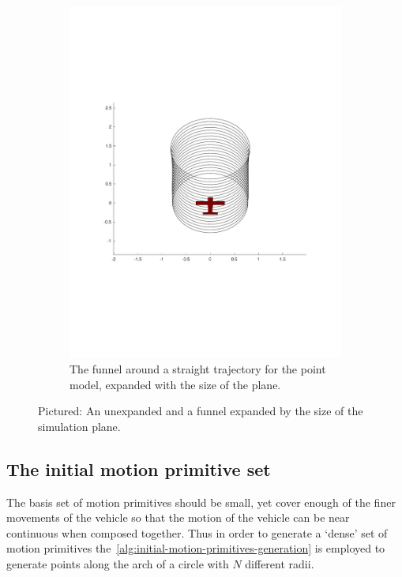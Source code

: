 \begin{figure}
\begin{subfigure}{0.5\textwidth}
    \includegraphics[trim={2cm 5cm 0cm 5cm},
    width=\textwidth]{figures/experiments/expanded-funnel-with-plane}
    \caption{The funnel around a straight trajectory for the point model,
      expanded with the size of the plane.}
  \end{subfigure}
  \caption{Pictured: An unexpanded and a funnel expanded by the size of the
    simulation plane.}
  \label{fig:expanded-and-unexpanded}
\end{figure}

\subsection{The initial motion primitive set}

The basis set of motion primitives should be small, yet cover enough of the
finer movements of the vehicle so that the motion of the vehicle can be near
continuous when composed together. Thus in order to generate a `dense' set of
motion primitives the~\cref{alg:initial-motion-primitives-generation} is
employed to generate points along the arch of a circle with \(N\) different
radii.


